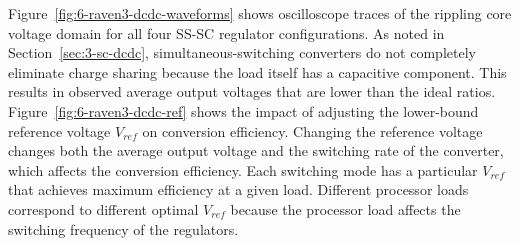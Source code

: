 \documentclass[graybox]{svmult}
\begin{document}

Figure~\ref{fig:6-raven3-dcdc-waveforms} shows oscilloscope traces of the rippling core voltage domain for all four SS-SC regulator configurations.
As noted in Section~\ref{sec:3-sc-dcdc}, simultaneous-switching converters do not completely eliminate charge sharing because the load itself has a capacitive component.
This results in observed average output voltages that are lower than the ideal ratios.
Figure~\ref{fig:6-raven3-dcdc-ref} shows the impact of adjusting the lower-bound reference voltage $V_{ref}$ on conversion efficiency.
Changing the reference voltage changes both the average output voltage and the switching rate of the converter, which affects the conversion efficiency.
Each switching mode has a particular $V_{ref}$ that achieves maximum efficiency at a given load.
Different processor loads correspond to different optimal $V_{ref}$ because the processor load affects the switching frequency of the regulators.
\end{document}
